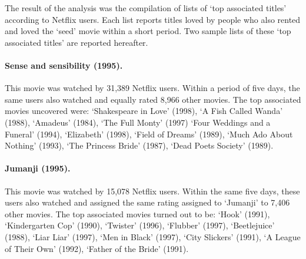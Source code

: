 \documentclass[a4paper,11pt]{memoir}
\theoremstyle{definition}
\begin{document}
The result of the analysis was the compilation of lists of `top associated titles' according to Netflix users.
Each list reports titles loved by people who also rented and loved the `seed'  movie within a short period. 
Two sample lists of these `top associated titles' are reported hereafter.

\paragraph{Sense and sensibility (1995).} %
\label{par:sense_and_sensibility}

This movie was watched by 31,389 Netflix users. 
Within a period of five days, the same users also watched and equally rated 8,966 other movies.
The top associated movies uncovered were:
`Shakespeare in Love' (1998), `A Fish Called Wanda' (1988), `Amadeus' (1984), `The Full Monty' (1997) `Four Weddings and a Funeral' (1994), `Elizabeth' (1998), `Field of Dreams' (1989), `Much Ado About Nothing' (1993), `The Princess Bride' (1987), `Dead Poets Society' (1989).

\paragraph{Jumanji (1995).} %
\label{par:jumanji}

This movie was watched by 15,078 Netflix users. 
Within the same five days, these users also watched and assigned the same rating assigned to `Jumanji' to 7,406 other movies. 
The top associated movies turned out to be:
`Hook' (1991), `Kindergarten Cop' (1990), `Twister' (1996), `Flubber' (1997), `Beetlejuice' (1988), `Liar Liar' (1997), `Men in Black' (1997), `City Slickers' (1991), `A League of Their Own' (1992), `Father of the Bride' (1991).  



% 
% 
\end{document}
